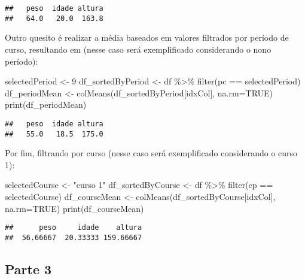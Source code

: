 \documentclass[
]{article}
\newenvironment{Shaded}{\begin{snugshade}}{\end{snugshade}}
\newcommand{\AttributeTok}[1]{\textcolor[rgb]{0.77,0.63,0.00}{#1}}
\newcommand{\ConstantTok}[1]{\textcolor[rgb]{0.00,0.00,0.00}{#1}}
\newcommand{\DecValTok}[1]{\textcolor[rgb]{0.00,0.00,0.81}{#1}}
\newcommand{\FunctionTok}[1]{\textcolor[rgb]{0.00,0.00,0.00}{#1}}
\newcommand{\NormalTok}[1]{#1}
\newcommand{\OtherTok}[1]{\textcolor[rgb]{0.56,0.35,0.01}{#1}}
\newcommand{\SpecialCharTok}[1]{\textcolor[rgb]{0.00,0.00,0.00}{#1}}
\newcommand{\StringTok}[1]{\textcolor[rgb]{0.31,0.60,0.02}{#1}}
\begin{document}
\begin{verbatim}
##   peso  idade altura 
##   64.0   20.0  163.8
\end{verbatim}

Outro quesito é realizar a média baseados em valores filtrados por
período de curso, resultando em (nesse caso será exemplificado
considerando o nono período):

\begin{Shaded}
\begin{Highlighting}[]
\NormalTok{selectedPeriod }\OtherTok{\textless{}{-}} \DecValTok{9}
\NormalTok{df\_sortedByPeriod }\OtherTok{\textless{}{-}}\NormalTok{ df }\SpecialCharTok{\%\textgreater{}\%} \FunctionTok{filter}\NormalTok{(pc }\SpecialCharTok{==}\NormalTok{ selectedPeriod) }
\NormalTok{df\_periodMean }\OtherTok{\textless{}{-}} \FunctionTok{colMeans}\NormalTok{(df\_sortedByPeriod[idxCol], }\AttributeTok{na.rm=}\ConstantTok{TRUE}\NormalTok{)}
\FunctionTok{print}\NormalTok{(df\_periodMean)}
\end{Highlighting}
\end{Shaded}

\begin{verbatim}
##   peso  idade altura 
##   55.0   18.5  175.0
\end{verbatim}

Por fim, filtrando por curso (nesse caso será exemplificado considerando
o curso 1):

\begin{Shaded}
\begin{Highlighting}[]
\NormalTok{selectedCourse }\OtherTok{\textless{}{-}} \StringTok{"curso 1"}
\NormalTok{df\_sortedByCourse }\OtherTok{\textless{}{-}}\NormalTok{ df }\SpecialCharTok{\%\textgreater{}\%} \FunctionTok{filter}\NormalTok{(cp }\SpecialCharTok{==}\NormalTok{ selectedCourse) }
\NormalTok{df\_courseMean }\OtherTok{\textless{}{-}} \FunctionTok{colMeans}\NormalTok{(df\_sortedByCourse[idxCol], }\AttributeTok{na.rm=}\ConstantTok{TRUE}\NormalTok{)}
\FunctionTok{print}\NormalTok{(df\_courseMean)}
\end{Highlighting}
\end{Shaded}

\begin{verbatim}
##      peso     idade    altura 
##  56.66667  20.33333 159.66667
\end{verbatim}

\hypertarget{parte-3}{%
\subsection{Parte 3}\label{parte-3}}
\end{document}
